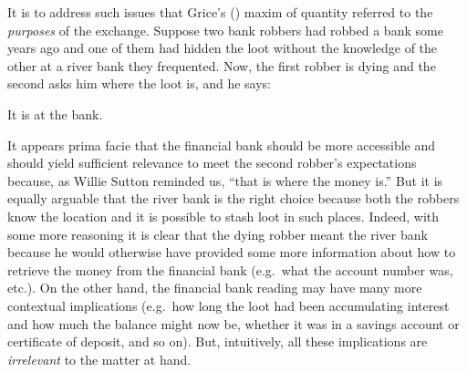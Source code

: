 %
%

%
%
%
%
%
%
%
%


It is to address such issues that Grice's (\citeyear{grice:lc, grice:sitwow}) maxim of quantity referred to the \emph{purposes} of the exchange. Suppose two bank robbers had robbed a bank some years ago and one of them had hidden the loot without the knowledge of the other at a river bank they frequented. Now, the first robber is dying and the second asks him where the loot is, and he says:

\ea It is at the bank.\z

\noindent It appears prima facie that the financial bank should be more accessible and should yield sufficient relevance to meet the second robber's expectations because, as Willie Sutton reminded us, ``that is where the money is.'' But it is equally arguable that the river bank is the right choice because both the robbers know the location and it is possible to stash loot in such places. Indeed, with some more reasoning it is clear that the dying robber meant the river bank because he would otherwise have  provided some more information about how to retrieve the money from the financial bank (e.g.\ what the account number was, etc.). On the other hand, the financial bank reading may have many more contextual implications (e.g.\ how long the loot had been accumulating interest and how much the balance might now be, whether it was in a savings account or certificate of deposit, and so on). But, intuitively, all these implications are \emph{irrelevant} to the matter at hand. 

